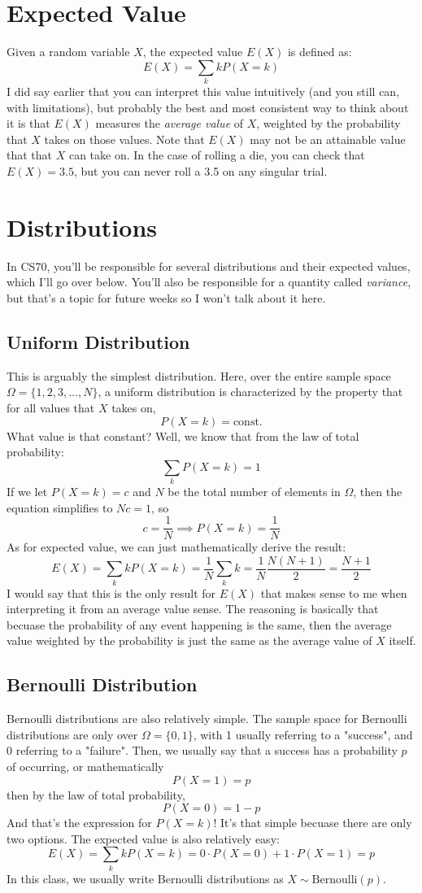 \documentclass[10pt]{article}
\begin{document}
\section{Expected Value}
Given a random variable \( X \), the expected value \( E(X) \) is defined as:
\[
E(X) = \sum_k k P(X = k)
\] 
I did say earlier that you can interpret this value intuitively (and you still can, with limitations), but 
probably the best and most consistent way to think about it is that \( E(X) \) measures the \textit{average value}
of \( X \), weighted by the probability that \( X \) takes on those values. Note that \( E(X) \) may not be 
an attainable value that that \( X \) can take on. In the case of rolling a die, you can check that \( E(X) = 3.5 \), 
but you can never roll a 3.5 on any singular trial.   
\section{Distributions}
In CS70, you'll be responsible for several distributions and their expected values, which I'll go over below. 
You'll also be responsible for a quantity called \textit{variance}, but that's a topic for future weeks so I won't 
talk about it here.
\subsection{Uniform Distribution}
This is arguably the simplest distribution. Here, over the entire sample space \( \Omega = 
\{1, 2, 3, \dots, N\} \), a uniform distribution 
is characterized by the property that for all values that \( X \) takes on, 
\[
P(X = k) = \text{const.}
\] 
What value is that constant? Well, we know that from the law of total probability:
\[
\sum_k P(X = k) = 1
\] 
If we let \( P(X =k) = c \) and \( N \) be the total number of elements in \( \Omega \), then the equation
simplifies to \( Nc = 1\), so
\[
	c = \frac{1}{N} \implies P(X=k) = \frac{1}{N}
\] 
As for expected value, we can just mathematically derive the result: 
\[
E(X) = \sum_k k P(X = k) = \frac{1}{N}	\sum_k k = \frac{1}{N}\frac{N(N+1)}{2} = \frac{N+1}{2}
\] 
I would say that this is the only result for \( E(X) \) that makes sense to me when interpreting it from an 
average value sense. The reasoning is basically that becuase the probability of any event happening is the same, then 
the average value weighted by the probability is just the same as the average value of \( X \) itself.  
\subsection{Bernoulli Distribution}
Bernoulli distributions are also relatively simple. The sample space for Bernoulli distributions are only over 
\( \Omega = \{0, 1\}  \), with 1 usually referring to a "success", and 0 referring to a "failure". Then, we usually 
say that a success has a probability \( p \) of occurring, or mathematically 
\[
P(X = 1) = p
\] 
then by the law of total probability, 
\[
P(X = 0) = 1-p
\] 
And that's the expression for \( P(X =k) \)! It's that simple becuase there are only two options. The expected 
value is also relatively easy:
\[
E(X) = \sum_k k P(X = k) = 0 \cdot P(X = 0) + 1 \cdot P(X = 1) = p
\] 
In this class, we usually write Bernoulli distributions as \(X \sim \text{Bernoulli}(p) \). 
\end{document}
